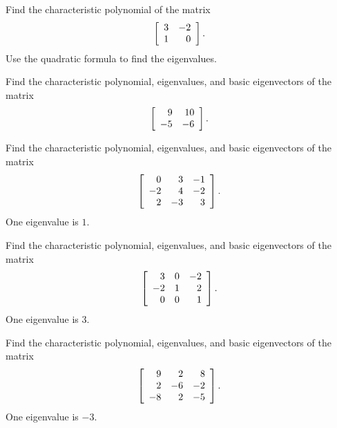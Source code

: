 \documentclass{ximera}
\author{Zack Reed}
\begin{document}
\begin{exercise}
  Find the characteristic polynomial of the matrix
  \begin{equation*}
    \startmat{rr}
      3 &  -2 \\
      1 &   0 \\
    \stopmat.
  \end{equation*}
  Use the quadratic formula to find the eigenvalues.
\end{exercise}

\begin{exercise}
  Find the characteristic polynomial, eigenvalues, and basic
  eigenvectors of the matrix
  \begin{equation*}
    \startmat{rr}
      9 &  10 \\
      -5 &  -6 \\
    \stopmat.
  \end{equation*}
\end{exercise}

\begin{exercise}
  Find the characteristic polynomial, eigenvalues, and basic
  eigenvectors of the matrix
  \begin{equation*}
    \startmat{rrr}
      0 &   3 &  -1 \\
      -2 &   4 &  -2 \\
      2 &  -3 &   3 \\
    \stopmat.
  \end{equation*}
  One eigenvalue is $1$.
\end{exercise}

\begin{exercise}
  Find the characteristic polynomial, eigenvalues, and basic
  eigenvectors of the matrix
  \begin{equation*}
    \startmat{rrr}
      3 &   0 &  -2 \\
      -2 &   1 &   2 \\
      0 &   0 &   1 \\
    \stopmat.
  \end{equation*}
  One eigenvalue is $3$.
\end{exercise}

\begin{exercise}
  Find the characteristic polynomial, eigenvalues, and basic
  eigenvectors of the matrix
  \begin{equation*}
    \startmat{rrr}
      9 & 2 & 8 \\
      2 & -6 & -2 \\
      -8 & 2 & -5 \\
    \stopmat.
  \end{equation*}
  One eigenvalue is $-3$.
\end{exercise}
\end{document}

